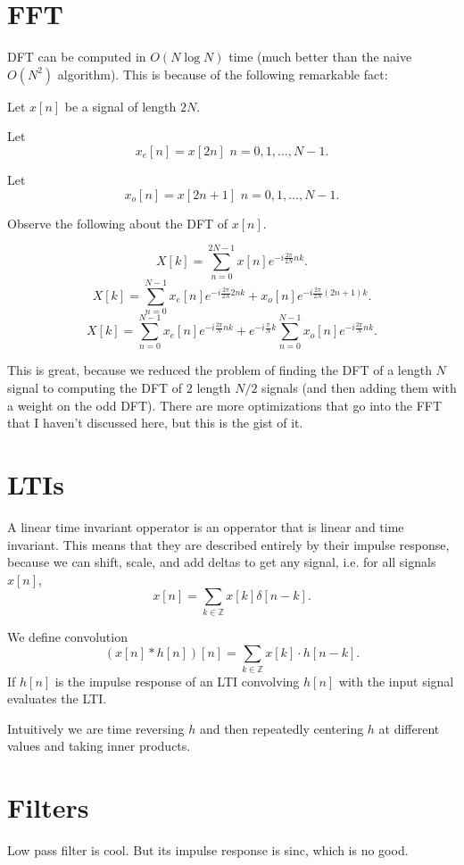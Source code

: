 \documentclass{article}[11pt]
\begin{document}
\section{FFT}
DFT can be computed in $O(N\log N)$ time (much better than the naive $O(N^2)$ algorithm).
This is because of the following remarkable fact:

Let $x[n]$ be a signal of length $2N$. 

Let $$x_e[n] = x[2n]\,\, n=0,1,\ldots, N-1.$$

Let $$x_o[n] = x[2n+1]\,\, n=0,1,\ldots, N-1.$$

Observe the following about the DFT of $x[n]$.

$$X[k] = \sum_{n=0}^{2N-1} x[n]e^{-i\frac{2\pi}{2N}nk}.$$
$$X[k] = \sum_{n=0}^{N-1} x_e[n] e^{-i\frac{2\pi}{2N}2nk} + x_o[n]e^{-i\frac{2\pi}{2N}(2n+1)k} .$$
$$X[k] = \sum_{n=0}^{N-1} x_e[n] e^{-i\frac{2\pi}{N}nk} + e^{-i\frac{\pi}{N}k} \sum_{n=0}^{N-1} x_o[n]e^{-i\frac{2\pi}{N}nk} .$$

This is great, because we reduced the problem of finding the DFT of a length $N$ signal to computing the DFT of $2$ length $N/2$ signals (and then adding them with a weight on the odd DFT).
There are more optimizations that go into the FFT that I haven't discussed here, but this is the gist of it.

\section{LTIs}
A linear time invariant opperator is an opperator that is linear and time invariant.
This means that they are described entirely by their impulse response, because we can shift, scale, and add deltas to get any signal, i.e. for all signals $x[n]$,
$$x[n] = \sum_{k\in\mathbb{Z}}x[k]\delta[n-k].$$

We define convolution 
$$(x[n]*h[n])[n] = \sum_{k\in\mathbb{Z}}x[k]\cdot h[n-k].$$
If $h[n]$ is the impulse response of an LTI convolving $h[n]$ with the input signal evaluates the LTI.

Intuitively we are time reversing $h$ and then repeatedly centering $h$ at different values and taking inner products.

\section{Filters}
Low pass filter is cool. But its impulse response is sinc, which is no good.
\end{document}
